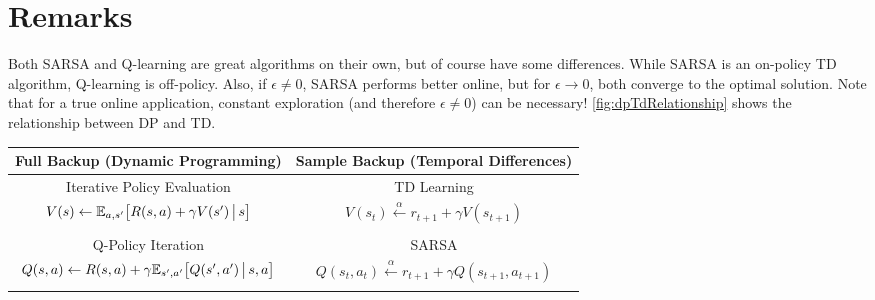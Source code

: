 	\section{Remarks}
		Both \ac{SARSA} and Q-learning are great algorithms on their own, but of course have some differences. While \ac{SARSA} is an on-policy \ac{TD} algorithm, Q-learning is off-policy. Also, if \(\epsilon \neq 0\), \ac{SARSA} performs better online, but for \(\epsilon \to 0\), both converge to the optimal solution. Note that for a true online application, constant exploration (and therefore \(\epsilon \neq 0\)) can be necessary! \autoref{fig:dpTdRelationship} shows the relationship between \ac{DP} and \ac{TD}.

		\begin{table}
			\centering
			\begin{tabular}{c|c}
				\toprule
				\textbf{Full Backup (Dynamic Programming)}                                                                & \textbf{Sample Backup (Temporal Differences)}                                                           \\ \midrule
				Iterative Policy Evaluation                                                                               & \acs{TD} Learning                                                                                       \\
				\( V(s) \gets \mathbb{E}_{a, s'}\bigl[ R(s, a) + \gamma V(s') \,\big\vert\, s \bigr] \)                               & \( V(s_t) \overset{\alpha}{\gets} r_{t + 1} + \gamma V(s_{t + 1}) \)                                    \\
				                                                                                                          &                                                                                                         \\
				Q-Policy Iteration                                                                                        & \acs{SARSA}                                                                                             \\
				\( Q(s, a) \gets R(s, a) + \gamma \mathbb{E}_{s', a'}\bigl[ Q(s', a') \,\big\vert\, s, a \bigr] \)                    & \( Q(s_t, a_t) \overset{\alpha}{\gets} r_{t + 1} + \gamma Q(s_{t + 1}, a_{t + 1}) \)                    \\
				                                                                                                          &                                                                                                         \\

\end{tabular}
\end{table}
